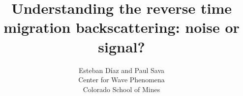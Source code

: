 

\author{Esteban D\'{i}az and Paul Sava\\ 
Center for Wave Phenomena \\ 
Colorado School of Mines}
\title{Understanding the reverse time migration backscattering: noise or signal?}
\maketitle








